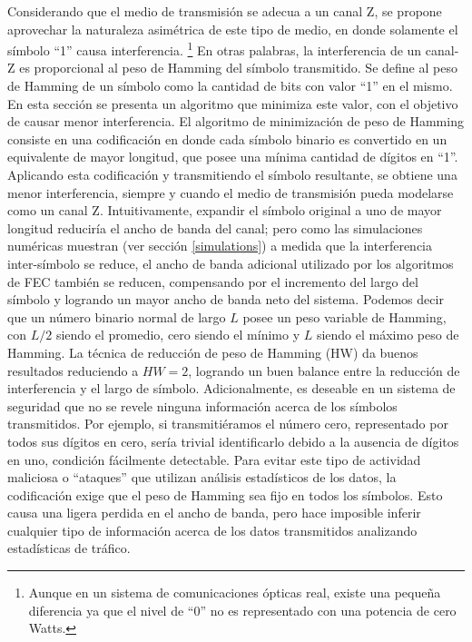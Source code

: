 Considerando que el medio de transmisión se adecua a un canal Z, se propone aprovechar la naturaleza asimétrica de este tipo de medio, en donde solamente el símbolo ``1'' causa interferencia. \footnote{Aunque en un sistema de comunicaciones ópticas real, existe una pequeña diferencia ya que el nivel de ``0'' no es representado con una potencia de cero Watts.}
En otras palabras, la interferencia de un canal-Z es proporcional al peso de Hamming del símbolo transmitido.
Se define al peso de Hamming de un símbolo como la cantidad de bits con valor ``1'' en el mismo. 
En esta sección se presenta un algoritmo que minimiza este valor, con el objetivo de causar menor interferencia. El algoritmo de minimización de peso de Hamming consiste en una codificación en donde cada símbolo binario es convertido en un equivalente de mayor longitud, que posee una mínima cantidad de dígitos en ``1''. Aplicando esta codificación y transmitiendo el símbolo resultante, se obtiene una menor interferencia, siempre y cuando el medio de transmisión pueda modelarse como un canal Z.
Intuitivamente, expandir el símbolo original a uno de mayor longitud reduciría el ancho de banda del canal; pero como las simulaciones numéricas muestran (ver sección \ref{simulations}) a medida que la interferencia inter-símbolo se reduce, el ancho de banda adicional utilizado por los algoritmos de FEC también se reducen, compensando por el incremento del largo del símbolo y logrando un mayor ancho de banda neto del sistema.
Podemos decir que un número binario normal de largo $L$ posee un peso variable de Hamming, con $L/2$ siendo el promedio, cero siendo el mínimo y $L$ siendo el máximo peso de Hamming.
La técnica de reducción de peso de Hamming (HW) da buenos resultados reduciendo a $HW=2$, logrando un buen balance entre la reducción de interferencia y el largo de símbolo.
Adicionalmente, es deseable en un sistema de seguridad que no se revele ninguna información acerca de los símbolos transmitidos. Por ejemplo, si transmitiéramos el número cero, representado por todos sus dígitos en cero, sería trivial identificarlo debido a la ausencia de dígitos en uno, condición fácilmente detectable. Para evitar este tipo de actividad maliciosa o ``ataques'' que utilizan análisis estadísticos de los datos, la codificación exige que el peso de Hamming sea fijo en todos los símbolos. Esto causa una ligera perdida en el ancho de banda, pero hace imposible inferir cualquier tipo de información acerca de los datos transmitidos analizando estadísticas de tráfico.

